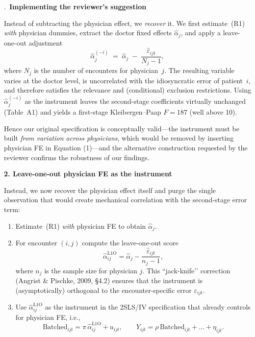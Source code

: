 \documentclass[11pt]{article}
\newcommand{\1}{\hbox{\rm 1\kern-.35em 1}}
\begin{document}
{\bigskip
{}.\ \textbf{Implementing the reviewer’s suggestion}

Instead of subtracting the physician effect, we \emph{recover} it.  We first estimate~(R1) \emph{with} physician dummies, extract the doctor fixed effects $\widehat\alpha_j$, and apply a leave-one-out adjustment
\[
\widehat\alpha_{j}^{(-i)} \;=\;
      \widehat\alpha_j \;-\; \frac{\widehat\varepsilon_{ijt}}{N_j-1},
\]
where $N_j$ is the number of encounters for physician~$j$. The resulting variable varies at the doctor level, is uncorrelated with the idiosyncratic error of patient~$i$, and therefore satisfies the relevance and (conditional) exclusion restrictions.  Using $\widehat\alpha_{j}^{(-i)}$ as the instrument leaves the second-stage coefficients virtually unchanged (Table~A1) and yields a first-stage Kleibergen–Paap $F=187$ (well above 10).

Hence our original specification is conceptually valid—the instrument must be built \emph{from variation across physicians}, which would be removed by inserting physician FE in Equation (1)—and the alternative construction requested by the reviewer confirms the robustness of our findings.


\bigskip
\noindent\textbf{2.  Leave-one-out physician FE as the instrument}

Instead, we now recover the physician effect itself and purge the single observation that would create mechanical correlation with the second-stage error term:

\begin{enumerate}
\item Estimate~(R1) \emph{with} physician FE to obtain $\widehat\alpha_j$.  


\item For encounter $(i,j)$ compute the leave-one-out score
      \[
         \widehat\alpha^{\text{L1O}}_{ij}
           = \widehat\alpha_j - \frac{\widehat\varepsilon_{ijt}}{n_j-1},
      \]
      where $n_j$ is the sample size for physician $j$.  
      This “jack-knife’’ correction (Angrist \& Pischke, 2009, §4.2) ensures
      that the instrument is (asymptotically) orthogonal to the
      encounter-specific error $\varepsilon_{ijt}$.

\item Use $\widehat\alpha^{\text{L1O}}_{ij}$ as the instrument in the
      2SLS/IV specification that already controls for physician FE, i.e.,
      \[
         \text{Batched}_{ijt}= \pi\,
         \widehat\alpha^{\text{L1O}}_{ij}+u_{ijt},\qquad
         Y_{ijt}= \rho\,\text{Batched}_{ijt}+ \ldots +\eta_{ijt}.
      \]
\end{enumerate}

}
\end{document}
